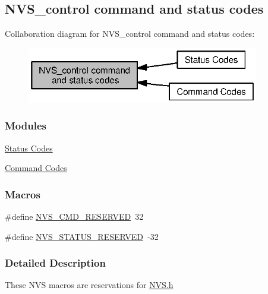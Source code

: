 \subsection{N\+V\+S\+\_\+control command and status codes}
\label{group___n_v_s___c_o_n_t_r_o_l}
Collaboration diagram for N\+V\+S\+\_\+control command and status codes\+:
\nopagebreak
\begin{figure}[H]
\begin{center}
\leavevmode
\includegraphics[width=287pt]{group___n_v_s___c_o_n_t_r_o_l}
\end{center}
\end{figure}
\subsubsection*{Modules}
\begin{DoxyCompactItemize}
\item 
\hyperlink{group___n_v_s___s_t_a_t_u_s}{Status Codes}
\item 
\hyperlink{group___n_v_s___c_m_d}{Command Codes}
\end{DoxyCompactItemize}
\subsubsection*{Macros}
\begin{DoxyCompactItemize}
\item 
\#define \hyperlink{group___n_v_s___c_o_n_t_r_o_l_gaa9fa1c41660d17139bce63ff34cd774f}{N\+V\+S\+\_\+\+C\+M\+D\+\_\+\+R\+E\+S\+E\+R\+V\+E\+D}~32
\item 
\#define \hyperlink{group___n_v_s___c_o_n_t_r_o_l_gad82fd139152ca14946c80c6c91edb4a0}{N\+V\+S\+\_\+\+S\+T\+A\+T\+U\+S\+\_\+\+R\+E\+S\+E\+R\+V\+E\+D}~-\/32
\end{DoxyCompactItemize}


\subsubsection{Detailed Description}
These N\+V\+S macros are reservations for \hyperlink{_n_v_s_8h}{N\+V\+S.\+h} 

